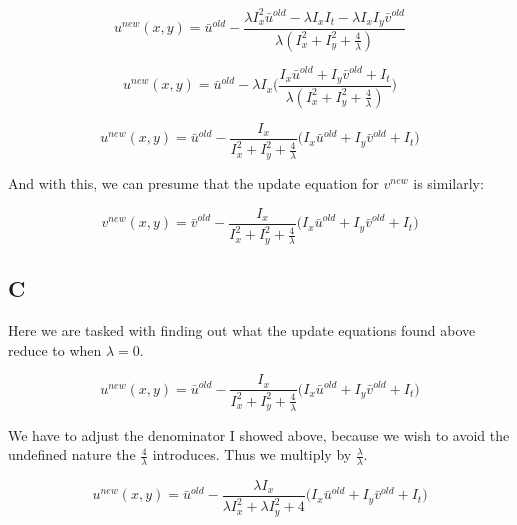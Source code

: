 \documentclass{article}
\begin{document}
\begin{equation}
    u^{new}(x,y) = \bar{u}^{old} - \frac
    {\lambda I_x^2 \bar{u}^{old} - \lambda I_x I_t - \lambda I_x I_y \bar{v}^{old}}
    {\lambda (I_x^2 + I_y^2 + \frac{4}{\lambda})}
\end{equation}

\begin{equation}
    u^{new}(x,y) = \bar{u}^{old} - \lambda I_x \Bigg(\frac
    {I_x \bar{u}^{old} + I_y \bar{v}^{old} + I_t}
    {\lambda (I_x^2 + I_y^2 + \frac{4}{\lambda})}\Bigg)
\end{equation}

\begin{equation}
    u^{new}(x,y) = \bar{u}^{old} -
    \frac{I_x}{I_x^2 + I_y^2 + \frac{4}{\lambda}}
    \bigg(
        I_x \bar{u}^{old} + I_y \bar{v}^{old} + I_t
    \bigg)
\end{equation}


\noindent And with this, we can presume that the update equation for $v^{new}$ is similarly:

\begin{equation}
    v^{new}(x,y) = \bar{v}^{old} -
    \frac{I_x}{I_x^2 + I_y^2 + \frac{4}{\lambda}}
    \bigg(
        I_x \bar{u}^{old} + I_y \bar{v}^{old} + I_t
    \bigg)
\end{equation}


\subsection*{C}

Here we are tasked with finding out what the update equations found above reduce to when $\lambda = 0$.

\begin{equation}
    u^{new}(x,y) = \bar{u}^{old} -
    \frac{I_x}{I_x^2 + I_y^2 + \frac{4}{\lambda}}
    \bigg(
        I_x \bar{u}^{old} + I_y \bar{v}^{old} + I_t
    \bigg)
\end{equation}

We have to adjust the denominator I showed above, because we wish to avoid the undefined nature the $\frac{4}{\lambda}$ introduces. Thus we multiply by $\frac{\lambda}{\lambda}$.

\begin{equation}
    u^{new}(x,y) = \bar{u}^{old} -
    \frac{\lambda I_x}{\lambda I_x^2 + \lambda I_y^2 + 4}
    \bigg(
        I_x \bar{u}^{old} + I_y \bar{v}^{old} + I_t
    \bigg)
\end{equation}
\end{document}
